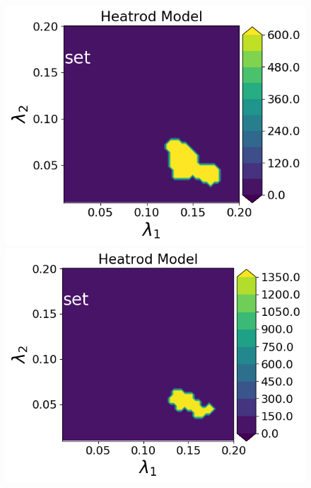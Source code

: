 \begin{figure}[h]
\begin{minipage}{.4\textwidth}
\includegraphics[width=\linewidth]{examples/fig_heatrod_q1/tHeatrodModel--set_N50_em.png}
\includegraphics[width=\linewidth]{examples/fig_heatrod_q1/tHeatrodModel--set_N500_em.png}


\end{minipage}
\end{figure}
